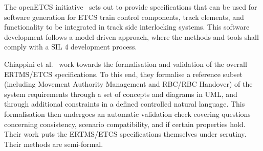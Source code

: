 The openETCS initiative~\cite{openETCS} sets out to provide
specifications that can be used for software generation for ETCS train
control components, track elements, and functionality to be integrated
in track side interlocking systems. This software development follows
a model-driven approach, where the methods and tools shall comply with
a SIL 4 development process. 

Chiappini et al.~\cite{chiappini10} work towards the
formalisation and validation of the overall ERTMS/ETCS
specifications. To this end, they formalise a reference subset
(including Movement Authority Management and RBC/RBC Handover) of the
system requirements through a set of concepts and diagrams in UML, and
through additional constraints in a defined controlled natural
language. This formalisation then undergoes an automatic validation
check covering questions concerning consistency, scenario
compatibility, and if certain properties hold. Their work puts the
ERTMS/ETCS specifications themselves under scrutiny. Their methods are
semi-formal.





